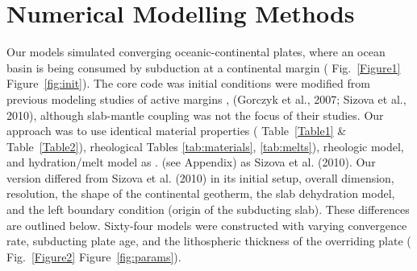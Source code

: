 \documentclass[draft,linenumbers]{agujournal2018} %
\providecommand{\DIFaddtex}[1]{{\protect\color{blue} \sf #1}} %
\providecommand{\DIFdeltex}[1]{{\protect\color{red} \scriptsize #1}} %
\providecommand{\DIFaddbegin}{} %
\providecommand{\DIFaddend}{} %
\providecommand{\DIFdelbegin}{} %
\providecommand{\DIFdelend}{} %
\providecommand{\DIFadd}[1]{\texorpdfstring{\DIFaddtex{#1}}{#1}} %
\providecommand{\DIFdel}[1]{\texorpdfstring{\DIFdeltex{#1}}{}} %
\newcommand{\DIFscaledelfig}{0.3}
\newlength{\DIFdelgraphicswidth} %
\newlength{\DIFdelgraphicsheight} %
\newcommand{\DIFaddincludegraphics}[2][]{{\color{blue}\fbox{\DIFOincludegraphics[#1]{#2}}}} %
\newcommand{\DIFdelincludegraphics}[2][]{%
\sbox{\DIFdelgraphicsbox}{\DIFOincludegraphics[#1]{#2}}%
\settoboxwidth{\DIFdelgraphicswidth}{\DIFdelgraphicsbox} %
\settoboxtotalheight{\DIFdelgraphicsheight}{\DIFdelgraphicsbox} %
\scalebox{\DIFscaledelfig}{%
\parbox[b]{\DIFdelgraphicswidth}{\usebox{\DIFdelgraphicsbox}\\[-\baselineskip] \rule{\DIFdelgraphicswidth}{0em}}\llap{\resizebox{\DIFdelgraphicswidth}{\DIFdelgraphicsheight}{%
\setlength{\unitlength}{\DIFdelgraphicswidth}%
\begin{picture}(1,1)%
\thicklines\linethickness{2pt} %
{\color[rgb]{1,0,0}\put(0,0){\framebox(1,1){}}}%
{\color[rgb]{1,0,0}\put(0,0){\line( 1,1){1}}}%
{\color[rgb]{1,0,0}\put(0,1){\line(1,-1){1}}}%
\end{picture}%
}\hspace*{3pt}}} %
} %
\DeclareRobustCommand{\DIFaddbegin}{\DIFOaddbegin \let\includegraphics\DIFaddincludegraphics} %
\DeclareRobustCommand{\DIFaddend}{\DIFOaddend \let\includegraphics\DIFOincludegraphics} %
\DeclareRobustCommand{\DIFdelbegin}{\DIFOdelbegin \let\includegraphics\DIFdelincludegraphics} %
\DeclareRobustCommand{\DIFdelend}{\DIFOaddend \let\includegraphics\DIFOincludegraphics} %
\begin{document}
\section{Numerical Modelling Methods}
\DIFaddbegin

\DIFaddend Our models simulated converging oceanic-continental plates, where an
ocean basin is being consumed by subduction at a continental margin
(\DIFdelbegin \DIFdel{Fig.~\ref{Figure1}}\DIFdelend \DIFaddbegin \DIFadd{Figure~\ref{fig:init}}\DIFaddend ). The \DIFdelbegin \DIFdel{core code was }\DIFdelend \DIFaddbegin \DIFadd{initial conditions were }\DIFaddend modified from
previous modeling studies of active margins \DIFdelbegin %
\DIFdel{, }\DIFdelend \DIFaddbegin \DIFadd{(Gorczyk et al., 2007;
Sizova et al., 2010), }\DIFaddend although slab-mantle coupling was not the focus of
their studies. Our approach was to use identical material properties
(\DIFdelbegin \DIFdel{Table~\ref{Table1} \& Table~\ref{Table2}), rheological }\DIFdelend \DIFaddbegin \DIFadd{Tables \ref{tab:materials}, \ref{tab:melts}), rheologic }\DIFaddend model, and
hydration/melt model \DIFdelbegin \DIFdel{as }%
\DIFdel{. }\DIFdelend \DIFaddbegin \DIFadd{(see Appendix) as Sizova et al. (2010). }\DIFaddend Our version
differed from \DIFdelbegin %
\DIFdelend \DIFaddbegin \DIFadd{Sizova et al. (2010) }\DIFaddend in its initial setup, overall
dimension, resolution, the shape of the continental geotherm, the slab
dehydration model, and the left boundary condition (origin of the
subducting slab). \DIFaddbegin \DIFadd{These differences are outlined below. }\DIFaddend Sixty-four
models were constructed \DIFaddbegin \DIFadd{with }\DIFaddend varying convergence rate, subducting plate
age, and the lithospheric thickness of the overriding plate
(\DIFdelbegin \DIFdel{Fig.~\ref{Figure2}}\DIFdelend \DIFaddbegin \DIFadd{Figure~\ref{fig:params}}\DIFaddend ).

\DIFdelbegin %
\end{document}
